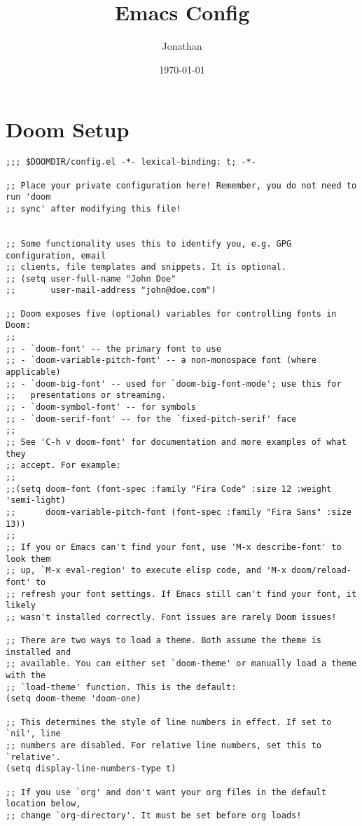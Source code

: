 \documentclass[11pt]{article}
\author{Jonathan}
\date{\today}
\title{Emacs Config}
\begin{document}
\maketitle
\tableofcontents

\section{Doom Setup}
\label{sec:org8a55733}

\begin{verbatim}
;;; $DOOMDIR/config.el -*- lexical-binding: t; -*-

;; Place your private configuration here! Remember, you do not need to run 'doom
;; sync' after modifying this file!


;; Some functionality uses this to identify you, e.g. GPG configuration, email
;; clients, file templates and snippets. It is optional.
;; (setq user-full-name "John Doe"
;;       user-mail-address "john@doe.com")

;; Doom exposes five (optional) variables for controlling fonts in Doom:
;;
;; - `doom-font' -- the primary font to use
;; - `doom-variable-pitch-font' -- a non-monospace font (where applicable)
;; - `doom-big-font' -- used for `doom-big-font-mode'; use this for
;;   presentations or streaming.
;; - `doom-symbol-font' -- for symbols
;; - `doom-serif-font' -- for the `fixed-pitch-serif' face
;;
;; See 'C-h v doom-font' for documentation and more examples of what they
;; accept. For example:
;;
;;(setq doom-font (font-spec :family "Fira Code" :size 12 :weight 'semi-light)
;;      doom-variable-pitch-font (font-spec :family "Fira Sans" :size 13))
;;
;; If you or Emacs can't find your font, use 'M-x describe-font' to look them
;; up, `M-x eval-region' to execute elisp code, and 'M-x doom/reload-font' to
;; refresh your font settings. If Emacs still can't find your font, it likely
;; wasn't installed correctly. Font issues are rarely Doom issues!

;; There are two ways to load a theme. Both assume the theme is installed and
;; available. You can either set `doom-theme' or manually load a theme with the
;; `load-theme' function. This is the default:
(setq doom-theme 'doom-one)

;; This determines the style of line numbers in effect. If set to `nil', line
;; numbers are disabled. For relative line numbers, set this to `relative'.
(setq display-line-numbers-type t)

;; If you use `org' and don't want your org files in the default location below,
;; change `org-directory'. It must be set before org loads!


\end{verbatim}
\end{document}
